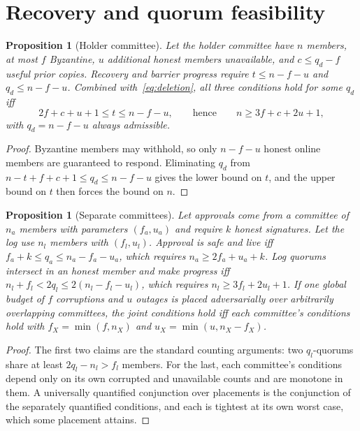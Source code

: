 \documentclass[pdflatex,sn-mathphys-num]{sn-jnl}
\theoremstyle{plain}
\newtheorem{proposition}[theorem]{Proposition}
\theoremstyle{definition}
\begin{document}
\section{Recovery and quorum feasibility}\label{sec:quorum}

\begin{proposition}[Holder committee]\label{prop:holders}
Let the holder committee have $n$ members, at most $f$ Byzantine, $u$ additional honest members unavailable, and $c\le q_d-f$ useful prior copies. Recovery and barrier progress require $t\le n-f-u$ and $q_d\le n-f-u$. Combined with~\eqref{eq:deletion}, all three conditions hold for some $q_d$ iff
\begin{equation}\label{eq:feasible}
 2f+c+u+1\le t\le n-f-u,\qquad\text{hence}\qquad n\ge3f+c+2u+1,
\end{equation}
with $q_d=n-f-u$ always admissible.
\end{proposition}
\begin{proof}
Byzantine members may withhold, so only $n-f-u$ honest online members are guaranteed to respond. Eliminating $q_d$ from $n-t+f+c+1\le q_d\le n-f-u$ gives the lower bound on $t$, and the upper bound on $t$ then forces the bound on $n$.
\end{proof}

\begin{proposition}[Separate committees]\label{prop:committees}
Let approvals come from a committee of $n_a$ members with parameters $(f_a,u_a)$ and require $k$ honest signatures. Let the log use $n_l$ members with $(f_l,u_l)$. Approval is safe and live iff $f_a+k\le q_a\le n_a-f_a-u_a$, which requires $n_a\ge2f_a+u_a+k$. Log quorums intersect in an honest member and make progress iff $n_l+f_l<2q_l\le2(n_l-f_l-u_l)$, which requires $n_l\ge3f_l+2u_l+1$. If one global budget of $f$ corruptions and $u$ outages is placed adversarially over arbitrarily overlapping committees, the joint conditions hold iff each committee's conditions hold with $f_X=\min(f,n_X)$ and $u_X=\min(u,n_X-f_X)$.
\end{proposition}
\begin{proof}
The first two claims are the standard counting arguments: two $q_l$-quorums share at least $2q_l-n_l>f_l$ members. For the last, each committee's conditions depend only on its own corrupted and unavailable counts and are monotone in them. A universally quantified conjunction over placements is the conjunction of the separately quantified conditions, and each is tightest at its own worst case, which some placement attains.
\end{proof}
\end{document}
